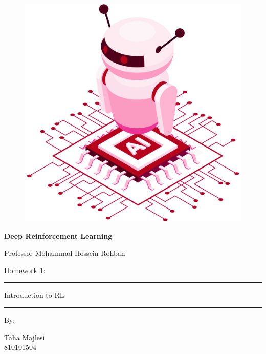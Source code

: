 \documentclass[12pt]{article}
\begin{document}
\thispagestyle{plain}

\begin{center}

\vspace*{-1.5cm}
\begin{figure}[!h]
    \centering
    \includegraphics[width=0.7\linewidth]{figs/cover-std.png}
\end{figure}

{

{\color{DarkBlue} {\fontsize{30}{50} \textbf{
Deep Reinforcement Learning
}}}

{\color{DarkBlue} {\Large
Professor Mohammad Hossein Rohban
}}
}


\vspace{20pt}

{


{\color{RedOrange}
{\Large
Homework 1:
}\\
}
{\color{BrickRed}
\rule{12cm}{0.5pt}

{\Huge
Introduction to RL
}
\rule{12cm}{0.5pt}
}

\vspace{10pt}

{\color{RoyalPurple} { \small By:} } \\
\vspace{10pt}

{\color{Blue} { \LARGE Taha Majlesi } } \\
\vspace{5pt}
{\color{RoyalBlue} { \Large 810101504 } }


}
\end{center}
\end{document}
